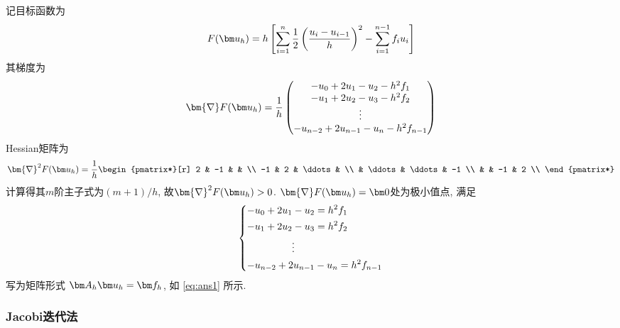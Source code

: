 \documentclass{nedsart}
\begin{document}
记目标函数为
\begin{equation}
    F(\uh) = h \left[ \sum^n_{i=1} {\frac{1}{2} \left( \frac{u_i - u_{i-1}}{h} \right)^2} - \sum^ {n-1}_{i=1} {f_i u_i} \right]
\end{equation}
其梯度为
\begin{equation}
    \bm{\nabla} F(\uh) = \frac{1}{h}
    \begin{pmatrix}
        - u_0 + 2 u_1 - u_2 - h^2 f_1  \\
        - u_1 + 2 u_2 - u_3 - h^2 f_2  \\
        \vdots \\
        - u_{n-2} + 2 u_{n-1} - u_n - h^2 f_{n-1} \\
    \end{pmatrix}
\end{equation}
Hessian矩阵为
\begin{equation}
    \bm{\nabla}^2 F(\uh) = \frac{1}{h} 
    \begin{pmatrix*}[r]
        2   & -1     &        &     \\
        -1  & 2      & \ddots &     \\
            & \ddots & \ddots & -1  \\
            &        & -1     & 2   \\
    \end{pmatrix*}  
\end{equation}
计算得其$m$阶主子式为$(m+1)/h$, 故$\bm{\nabla}^2 F(\uh)>0$. $\bm{\nabla} F(\uh) = \bm0$处为极小值点, 满足
\begin{equation}
    \begin{dcases}
        - u_0 + 2 u_1 - u_2 = h^2 f_1  \\
        - u_1 + 2 u_2 - u_3 = h^2 f_2  \\
        \hspace{4.5em} \vdots \\
        - u_{n-2} + 2 u_{n-1} - u_n = h^2 f_{n-1} \\ 
    \end{dcases}
\end{equation}
写为矩阵形式 $\Ah \uh = \fh$, 如 \eqref{eq:ans1} 所示.

\subsubsection{Jacobi迭代法}

\def\bD{\bm{D}}
\def\bL{\bm{L}}
\def\bU{\bm{U}}
\end{document}
